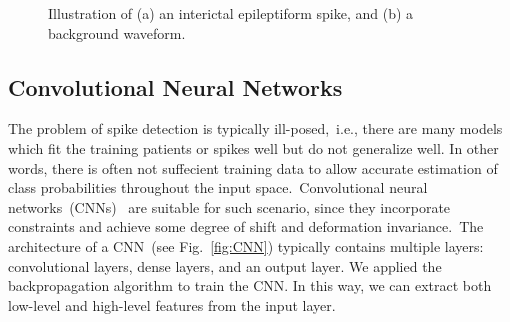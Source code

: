 \documentclass{article}
\begin{document}
\begin{figure}[!tbh]
\begin{subfigure}[b]{.22\textwidth}
            \caption{}
        \end{subfigure}

        \caption{Illustration of (a) an interictal epileptiform spike, and (b) a background waveform.}
        \label{fig:waveforms}
\end{figure}


\subsection{Convolutional Neural Networks}

The problem of spike detection is typically ill-posed,~i.e., there are many models which fit the training patients or spikes well but do not generalize well.
In other words, there is often not suffecient training data to allow accurate estimation of class probabilities throughout the input space.~Convolutional neural networks~(CNNs)~\cite{lawrence1997face} are suitable for such scenario, since they incorporate constraints and achieve some degree of shift and deformation invariance.~The architecture of a CNN~(see Fig.~\ref{fig:CNN}) typically contains multiple layers: convolutional layers, dense layers, and an output layer.
We applied the backpropagation algorithm to train the CNN. In this way, we can extract both low-level and high-level features from the input layer.
\end{document}
